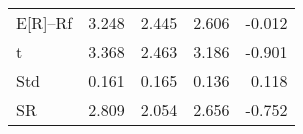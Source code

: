 \begin{tabular}{lrrrr}
\toprule
\midrule
E[R]--Rf & 3.248 & 2.445 & 2.606 & -0.012 \\
t & 3.368 & 2.463 & 3.186 & -0.901 \\
Std & 0.161 & 0.165 & 0.136 & 0.118 \\
SR & 2.809 & 2.054 & 2.656 & -0.752 \\
\bottomrule
\end{tabular}
